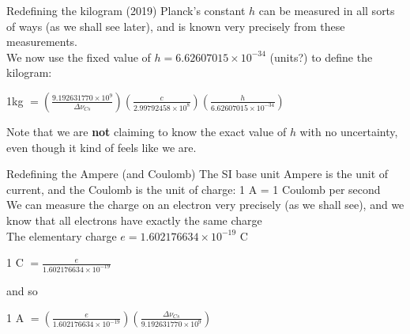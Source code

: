 \begin{frame}{Redefining the kilogram (2019)}
\small
Planck's constant $h$ can be measured in all sorts of ways (as we shall see later), and is known very precisely from these measurements.\\[1ex]

We now use the fixed value of $h = 6.62607015\times10^{-34}$ (units?) to define the kilogram:\\[1ex]

\begin{center}

1kg $ = \displaystyle  \left( \frac{9.192631770 \times 10^{9}}{\Delta \nu_{Cs}} \right)       \left( \frac{c}{2.99792458 \times 10^{8}}\right)        \left( \frac{h}{6.62607015\times10^{-34}}\right) $\\[2ex]
 \end{center}
 \vspace{0.5cm}

Note that we are \textbf{not} claiming to know the exact value of $h$ with no uncertainty, even though it kind of feels like we are.\\[1ex]

\end{frame}



\begin{frame}{Redefining the Ampere (and Coulomb)}
\small
The SI base unit Ampere is the unit of current, and the Coulomb is the unit of charge: 1  A = 1 Coulomb per  second\\[1ex]

We can measure the charge on an electron very precisely (as we shall see), and we know that all electrons have exactly the same charge\\[1ex]

The elementary charge $e = 1.602176634\times10^{-19}$ C\\[1ex]


\begin{center}
1 C $ = \displaystyle \frac{e}{1.602176634\times10^{-19}} $\\[2ex]
\end{center}

and so 

\begin{center}
1 A $ = \displaystyle \left( \frac{e}{1.602176634\times10^{-19}}\right)  \left( \frac{\Delta \nu_{Cs}}{9.192631770 \times 10^{9}}\right) $\\[2ex]
\end{center}


\end{frame}




